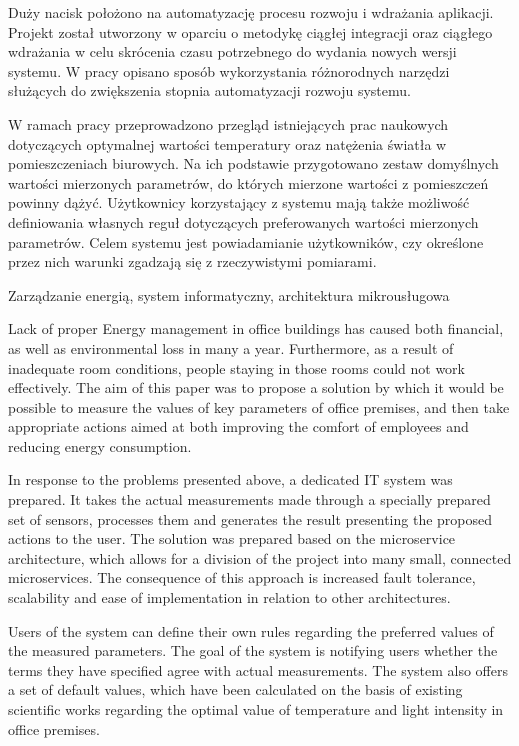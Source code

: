 \documentclass[
    left=2.5cm,         %
    right=2.5cm,        %
    top=2.5cm,          %
    bottom=3cm,         %
    bindingoffset=6mm,  %
    nohyphenation=false %
]{eiti/eiti-thesis}
\begin{document}
Duży nacisk położono na automatyzację procesu rozwoju i wdrażania aplikacji. 
Projekt został utworzony w oparciu o metodykę ciągłej integracji oraz
ciągłego wdrażania w celu skrócenia czasu potrzebnego do wydania nowych
wersji systemu. W pracy opisano sposób wykorzystania różnorodnych narzędzi
służących do zwiększenia stopnia automatyzacji rozwoju systemu. 

W ramach pracy przeprowadzono przegląd istniejących prac naukowych 
dotyczących optymalnej wartości temperatury oraz natężenia światła w 
pomieszczeniach biurowych. Na ich podstawie przygotowano zestaw
domyślnych wartości mierzonych parametrów, do których mierzone wartości
z pomieszczeń powinny dążyć. Użytkownicy korzystający z systemu mają także 
możliwość definiowania własnych reguł
dotyczących preferowanych wartości mierzonych parametrów. Celem systemu jest
powiadamianie użytkowników, czy określone przez nich warunki zgadzają się
z rzeczywistymi pomiarami.

\slowakluczowe Zarządzanie energią, system informatyczny, architektura mikrousługowa

\newpage
\abstract
Lack of proper Energy management in office buildings has caused both 
financial, as well as environmental loss in many a year. Furthermore, as 
a result of inadequate room conditions, people staying in those rooms could 
not work effectively. The aim of this paper was to propose a solution by which 
it would be possible to measure the values of key parameters of office 
premises, and then take appropriate actions aimed at both improving the comfort 
of employees and reducing energy consumption.

In response to the problems presented above, a dedicated IT system was prepared. 
It takes the actual measurements made
through a specially prepared set of sensors, processes them and generates
the result presenting the proposed actions to the user.
The solution was prepared based on the microservice architecture, which
allows for a division of the project into many small, connected microservices.
The consequence of this approach is increased fault tolerance, scalability
and ease of implementation in relation to other architectures.

Users of the system can define their own rules
regarding the preferred values of the measured parameters. The goal of the system is
notifying users whether the terms they have specified agree
with actual measurements. The system also offers a set of default values,
which have been calculated on the basis of existing scientific works
regarding the optimal value of temperature and light intensity in
office premises.
\end{document}
